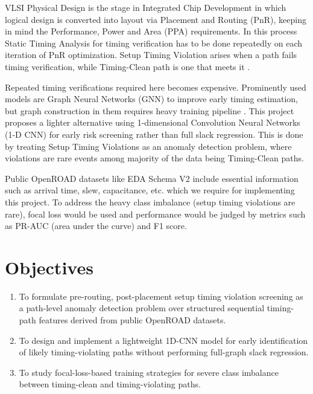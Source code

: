 \documentclass[12pt,a4paper]{article}
\begin{document}
VLSI Physical Design is the stage in Integrated Chip Development in which logical design is converted into layout via Placement and Routing (PnR), keeping in mind the Performance, Power and Area (PPA) requirements. In this process Static Timing Analysis for timing verification has to be done repeatedly on each iteration of PnR optimization. Setup Timing Violation arises when a path fails timing verification, while Timing-Clean path is one that meets it \cite{Jenila2025A}.

Repeated timing verifications required here becomes expensive. Prominently used models are Graph Neural Networks (GNN) to improve early timing estimation, but graph construction in them requires heavy training pipeline \cite{Guo2022A,Li2025Pre-Routing}. This project proposes a lighter alternative using 1-dimensional Convolution Neural Networks (1-D CNN) for early risk screening rather than full slack regression. This is done by treating Setup Timing Violations as an anomaly detection problem, where violations are rare events among majority of the data being Timing-Clean paths.

Public OpenROAD datasets like EDA Schema V2 \cite{Shrestha2026EDA-Schema-V2:,Shrestha2024EDA-schema:} include essential information such as arrival time, slew, capacitance, etc. which we require for implementing this project. To address the heavy class imbalance (setup timing violations are rare), focal loss would be used \cite{Lin2017Focal, Mahmoodi2024Automatically} and performance would be judged by metrics such as PR-AUC (area under the curve) and F1 score.

\section{Objectives} \label{sec:Obj}
\begin{enumerate}
\item To formulate pre-routing, post-placement setup timing violation screening as a path-level anomaly detection problem over structured sequential timing-path features derived from public OpenROAD datasets.
\item To design and implement a lightweight 1D-CNN model for early identification of likely timing-violating paths without performing full-graph slack regression.
\item To study focal-loss-based training strategies for severe class imbalance between timing-clean and timing-violating paths.
\end{enumerate}
\end{document}
